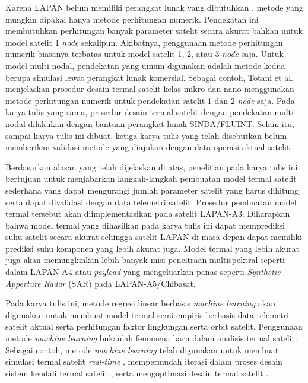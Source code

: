 Karena LAPAN belum memiliki perangkat lunak yang dibutuhkan
\cite{budiantoro2019}, metode yang mungkin dipakai hanya metode perhitungan
numerik. Pendekatan ini membutuhkan perhitungan banyak parameter satelit secara
akurat bahkan untuk model satelit 1 \textit{node} sekalipun. Akibatnya, penggunaan
metode perhitungan numerik biasanya terbatas untuk model satelit 1, 2, atau 3
\textit{node} saja. Untuk model multi-nodal, pendekatan yang umum digunakan adalah
metode kedua berupa simulasi lewat perangkat lunak komersial. Sebagai contoh,
Totani et al. \cite{totani2014} menjelaskan prosedur desain termal satelit
kelas mikro dan nano menggunakan metode perhitungan numerik untuk pendekatan
satelit 1 dan 2 \textit{node} saja. Pada karya tulis yang sama, prosedur desain termal
satelit dengan pendekatan multi-nodal dilakukan dengan bantuan perangkat lunak
SINDA/FLUINT. Selain itu, sampai karya tulis ini dibuat, ketiga karya tulis
yang telah disebutkan belum memberikan validasi metode yang diajukan dengan
data operasi aktual satelit.

Berdasarkan alasan yang telah dijelaskan di atas, penelitian pada karya tulis
ini bertujuan untuk menjabarkan langkah-langkah pembuatan model termal satelit
sederhana yang dapat mengurangi jumlah parameter satelit yang harus dihitung
serta dapat divalidasi dengan data telemetri satelit. Prosedur pembuatan model
termal tersebut akan diimplementasikan pada satelit LAPAN-A3. Diharapkan bahwa
model termal yang dihasilkan pada karya tulis ini dapat memprediksi suhu
satelit secara akurat sehingga satelit LAPAN di masa depan dapat memiliki
prediksi suhu komponen yang lebih akurat juga. Model termal yang lebih akurat
juga akan memungkinkan lebih banyak misi pencitraan multispektral seperti dalam
LAPAN-A4 atau \textit{payload} yang mengeluarkan panas seperti
\textit{Synthetic Apperture Radar} (SAR) pada LAPAN-A5/Chibasat.


Pada karya tulis ini, metode regresi linear berbasis \textit{machine learning} akan
digunakan untuk membuat model termal semi-empiris berbasis data telemetri
satelit aktual serta perhitungan faktor lingkungan serta orbit satelit.
Penggunaan metode \textit{machine learning} bukanlah fenomena baru dalam analisis termal
satelit. Sebagai contoh, metode \textit{machine learning} telah digunakan untuk membuat
simulasi termal satelit \textit{real-time} \cite{junior2017}, mempermudah
iterasi dalam proses desain sistem kendali termal satelit \cite{escobar2016},
serta mengoptimasi desain termal satelit \cite{xiong2020}.

